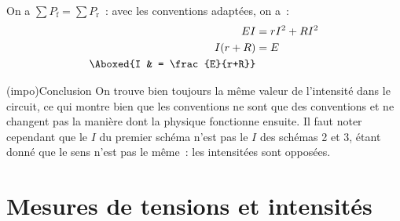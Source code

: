 \documentclass[../../main/main.tex]{subfiles}
\begin{document}
{\begin{tcbraster}[raster columns=7, raster equal height=rows]
\begin{tcb}[raster multicolumn=3]
        \subsubsection{}
        On a $\sum P_{\text{f}} = \sum P_{\text{r}}$~: avec les
        conventions adaptées, on a~:
        \begin{align*}
            EI        & = rI^2 + RI^2\\
            I(r+R)    & = E\\
            \Aboxed{I & = \frac{E}{r+R}}
        \end{align*}
    \end{tcb}
\end{tcbraster}
\begin{center}
    \begin{tcb}[width=\linewidth](impo){Conclusion}
        On trouve bien toujours la même valeur de l'intensité dans le circuit,
        ce qui montre bien que les conventions ne sont que des conventions et ne
        changent pas la manière dont la physique fonctionne ensuite. Il faut
        noter cependant que le $I$ du premier schéma n'est pas le $I$ des
        schémas 2 et 3, étant donné que le sens n'est pas le même~: les
        intensitées sont opposées.
    \end{tcb}
\end{center}
}

\section{Mesures de tensions et intensités}
\end{document}
